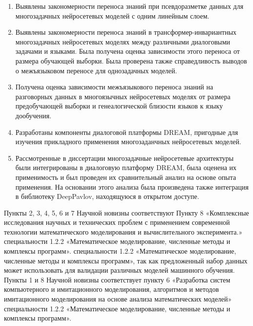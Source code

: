 {\novelty}
\begin{enumerate}
  \item {Выявлены закономерности переноса знаний при псевдоразметке данных для многозадачных нейросетевых моделей с одним линейным слоем.}
  \item {Выявлены закономерности переноса знаний в трансформер-инвариантных многозадачных нейросетевых моделях между различными диалоговыми задачами и языками. Была получена оценка зависимости этого переноса от размера обучающей выборки. Была проверена также справедливость выводов о межъязыковом переносе для однозадачных моделей.}
  \item {Получена оценка зависимости межъязыкового переноса знаний на разговорных данных в многоязычных нейросетевых моделях от размера предобучающей выборки и генеалогической близости языков к языку дообучения.}
  \item {Разработаны компоненты диалоговой платформы DREAM, пригодные для изучения прикладного применения многозаданчных нейросетевых моделей.}
  \item {Рассмотренные в диссертации многозадачные нейросетевые архитектуры были интегрированы в диалоговую платформу DREAM, была оценена их применимость и был проведен их сравнительный анализ на основе опыта применения. На основании этого анализа была произведена также интеграция в библиотеку DeepPavlov, находящуюся в открытом доступе.}
\end{enumerate}

{\appropriation}
Пункты 2, 3, 4, 5, 6 и 7 Научной новизны соответствуют Пункту 8 «Комплексные исследования научных и технических проблем с применением современной технологии математического моделирования и вычислительного эксперимента.» специальности 1.2.2 «Математическое моделирование, численные методы и комплексы программ». специальности 1.2.2 «Математическое моделирование, численные методы и комплексы программ», так как предложенный набор данных может использовать для валидации различных моделей машинного обучения. Пункты 1 и 8 Научной новизны соответствует пункту 6 «Разработка систем компьютерного и имитационного моделирования, алгоритмов и методов имитационного моделирования на основе анализа математических моделей» специальности 1.2.2 «Математическое моделирование, численные методы и комплексы программ». %

